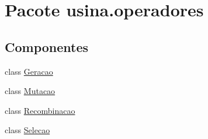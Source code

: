 \hypertarget{namespaceusina_1_1operadores}{\section{Pacote usina.\-operadores}
\label{namespaceusina_1_1operadores}
}
\subsection*{Componentes}
\begin{DoxyCompactItemize}
\item 
class \hyperlink{classusina_1_1operadores_1_1_geracao}{Geracao}
\item 
class \hyperlink{classusina_1_1operadores_1_1_mutacao}{Mutacao}
\item 
class \hyperlink{classusina_1_1operadores_1_1_recombinacao}{Recombinacao}
\item 
class \hyperlink{classusina_1_1operadores_1_1_selecao}{Selecao}
\end{DoxyCompactItemize}
